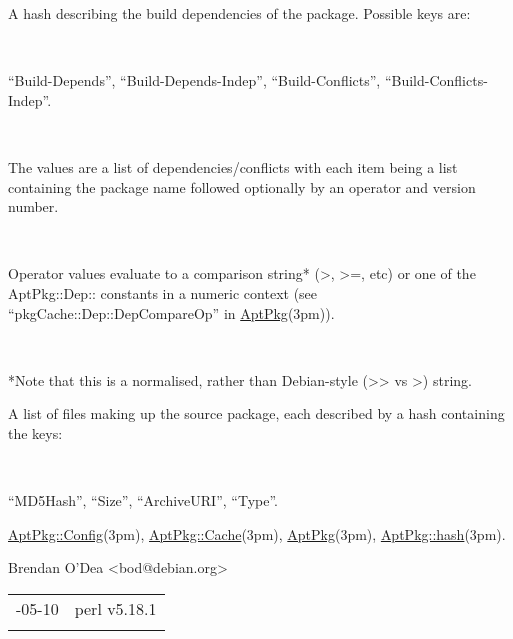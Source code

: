 \documentclass[]{article}
\renewcommand{\emph}[1]{\underline{#1}}
\begin{document}
\begin{description}
\itemsep1pt\parskip0pt
\item[BuildDepends]
A hash describing the build dependencies of the package. Possible keys
are:
\end{description}

~

``Build-Depends'', ``Build-Depends-Indep'', ``Build-Conflicts'',
``Build-Conflicts-Indep''.

~

The values are a list of dependencies/conflicts with each item being a
list containing the package name followed optionally by an operator and
version number.

~

Operator values evaluate to a comparison string* (\textgreater{},
\textgreater{}=, etc) or one of the AptPkg::Dep:: constants in a numeric
context (see ``pkgCache::Dep::DepCompareOp'' in \emph{AptPkg}(3pm)).

~

*Note that this is a normalised, rather than Debian-style
(\textgreater{}\textgreater{} vs \textgreater{}) string.

\begin{description}
\itemsep1pt\parskip0pt
\item[Files]
A list of files making up the source package, each described by a hash
containing the keys:
\end{description}

~

``MD5Hash'', ``Size'', ``ArchiveURI'', ``Type''.


\emph{AptPkg::Config}(3pm), \emph{AptPkg::Cache}(3pm),
\emph{AptPkg}(3pm), \emph{AptPkg::hash}(3pm).


Brendan O'Dea \textless{}bod@debian.org\textgreater{}

\begin{longtable}[c]{@{}ll@{}}
\toprule\addlinespace
2013-05-10 & perl v5.18.1
\\\addlinespace
\bottomrule
\end{longtable}
\end{document}
